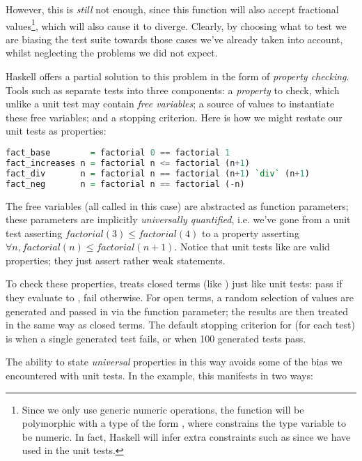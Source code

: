 However, this is \emph{still} not enough, since this function will also accept fractional values\footnote{Since we only use generic numeric operations, the function will be polymorphic with a type of the form , where  constrains the type variable  to be numeric. In fact, Haskell will infer extra constraints such as  since we have used \hs{==} in the unit tests.}, which will also cause it to diverge. Clearly, by choosing what to test we are biasing the test suite towards those cases we've already taken into account, whilst neglecting the problems we did not expect.

Haskell offers a partial solution to this problem in the form of \emph{property checking}. Tools such as \qcheck{} separate tests into three components: a \emph{property} to check, which unlike a unit test may contain \emph{free variables}; a source of values to instantiate these free variables; and a stopping criterion. Here is how we might restate our unit tests as properties:

\begin{lstlisting}[language=Haskell, xleftmargin=.2\textwidth, xrightmargin=.2\textwidth]
fact_base        = factorial 0 == factorial 1
fact_increases n = factorial n <= factorial (n+1)
fact_div       n = factorial n == factorial (n+1) `div` (n+1)
fact_neg       n = factorial n == factorial (-n)
\end{lstlisting}

The free variables (all called  in this case) are abstracted as function parameters; these parameters are implicitly \emph{universally quantified}, i.e. we've gone from a unit test asserting $factorial(3) \leq factorial(4)$ to a property asserting $\forall n, factorial(n) \leq factorial(n+1)$. Notice that unit tests like  are valid properties; they just assert rather weak statements.

To check these properties, \qcheck{} treats closed terms (like ) just like unit tests: pass if they evaluate to , fail otherwise. For open terms, a random selection of values are generated and passed in via the function parameter; the results are then treated in the same way as closed terms. The default stopping criterion for \qcheck{} (for each test) is when a single generated test fails, or when 100 generated tests pass.

The ability to state \emph{universal} properties in this way avoids some of the bias we encountered with unit tests. In the  example, this manifests in two ways:


